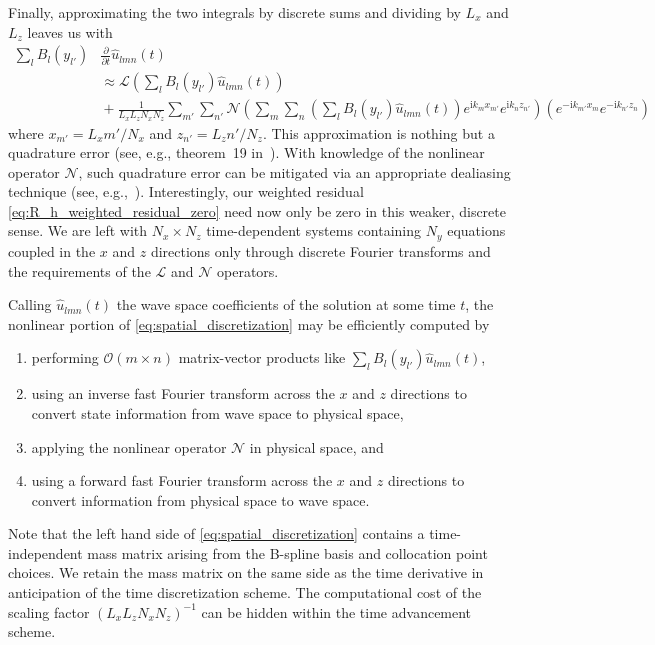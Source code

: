 \documentclass[letterpaper,11pt,nointlimits,reqno]{amsart}
\newcommand{\ii}{\ensuremath{\mathrm{i}}}
\begin{document}
Finally, approximating the two integrals by discrete sums and dividing
by $L_x$ and $L_z$ leaves us with
\begin{align}
  \sum_{l} B_l\!\left(y_{l'}\right)
  &\frac{\partial}{\partial{}t} \hat{u}_{l m n}(t)
\\
  &\approx
  \mathscr{L}\left(
    \sum_{l}
     B_l\!\left(y_{l'}\right)
    \hat{u}_{l m n}(t)
  \right)
\\
  &{}+
  \frac{1}{L_x L_z N_x N_z}
  \sum_{m'} \sum_{n'}
  \mathscr{N}\left(
    \sum_{m}
    \sum_{n}
    \left(
      \sum_{l} B_l\!\left(y_{l'}\right)
      \hat{u}_{l m n}(t)
    \right)
    e^{\ii k_m x_{m'}}e^{\ii k_n z_{n'}}
  \right)
  \left(
    e^{-\ii k_{m'} x_m}e^{-\ii k_{n'} z_n}
  \right)
  \label{eq:spatial_discretization}
\end{align}
where $x_{m'}=L_x m' / N_x$ and $z_{n'}=L_z n' / N_z$.  This approximation is
nothing but a quadrature error (see, e.g., theorem~19 in~\cite{Boyd2001}).
With knowledge of the nonlinear operator $\mathscr{N}$, such quadrature error
can be mitigated via an appropriate dealiasing technique (see,
e.g.,~\cite{Canuto2006}).  Interestingly, our weighted residual
\eqref{eq:R_h_weighted_residual_zero} need now only be zero in this weaker,
discrete sense.  We are left with $N_x\times{}N_z$ time-dependent systems
containing $N_y$ equations coupled in the $x$ and $z$ directions only through
discrete Fourier transforms and the requirements of the $\mathscr{L}$ and
$\mathscr{N}$ operators.

Calling $\hat{u}_{l m n}(t)$ the wave space coefficients of the solution at
some time $t$, the nonlinear portion of \eqref{eq:spatial_discretization} may
be efficiently computed by
\begin{enumerate}
 \item performing $\mathcal{O}\!\left(m\times{}n\right)$ matrix-vector products
       like $\sum_{l} B_l\!\left(y_{l'}\right) \hat{u}_{l m n}(t)$,
 \item using an inverse fast Fourier transform across
       the $x$ and $z$ directions to convert state information from wave space
       to physical space,
 \item applying the nonlinear operator $\mathscr{N}$ in physical space, and
 \item using a forward fast Fourier transform across the $x$ and $z$
       directions to convert information from physical space to wave space.
\end{enumerate}
Note that the left hand side of \eqref{eq:spatial_discretization} contains a
time-independent mass matrix arising from the B-spline basis and collocation
point choices.  We retain the mass matrix on the same side as the time
derivative in anticipation of the time discretization scheme.  The
computational cost of the scaling factor $\left(L_x L_z N_x N_z\right)^{-1}$
can be hidden within the time advancement scheme.
\end{document}
